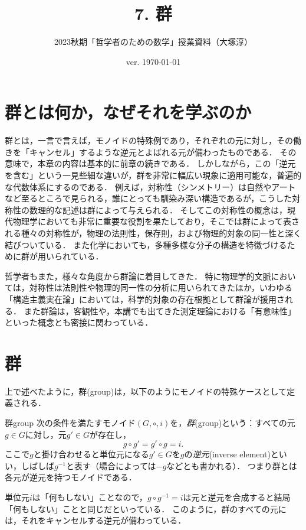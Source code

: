 \documentclass[11pt,a4paper]{jsarticle}
\begin{document}
\title{7. 群}
\author{2023秋期「哲学者のための数学」授業資料（大塚淳）}
\date{ver. \today}
\maketitle

\section{群とは何か，なぜそれを学ぶのか}
群とは，一言で言えば，モノイドの特殊例であり，それぞれの元に対し，その働きを「キャンセル」するような逆元とよばれる元が備わったものである．
その意味で，本章の内容は基本的に前章の続きである．
しかしながら，この「逆元を含む」という一見些細な違いが，群を非常に幅広い現象に適用可能な，普遍的な代数体系にするのである．
例えば，対称性（シンメトリー）は自然やアートなど至るところで見られる，誰にとっても馴染み深い構造であるが，こうした対称性の数理的な記述は群によって与えられる．
そしてこの対称性の概念は，現代物理学においても非常に重要な役割を果たしており，そこでは群によって表される種々の対称性が，物理の法則性，保存則，および物理的対象の同一性と深く結びついている．
また化学においても，多種多様な分子の構造を特徴づけるために群が用いられている．

哲学者もまた，様々な角度から群論に着目してきた．
特に物理学的文脈においては，対称性は法則性や物理的同一性の分析に用いられてきたほか，いわゆる「構造主義実在論」においては，科学的対象の存在根拠として群論が援用される．
また群論は，客観性や，本講でも出てきた測定理論における「有意味性」といった概念とも密接に関わっている．



\section{群}
上で述べたように，群(group)は，以下のようにモノイドの特殊ケースとして定義される．
\begin{dfn}{群}{group}
    次の条件を満たすモノイド$(G, \circ, i)$を，\emph{群}(group)という：すべての元$g \in G$に対し，元$g' \in G$が存在し，
    \[ g \circ g' = g' \circ g = i.\]
    ここで$g$と掛け合わせると単位元になる$g' \in G$を$g$の\emph{逆元}(inverse element)といい，しばしば$g^{-1}$と表す（場合によっては$-g$などとも書かれる）．
    つまり群とは各元が逆元を持つモノイドである．
\end{dfn}    

単位元$i$は「何もしない」ことなので，$g \circ g^{-1} = i$は元と逆元を合成すると結局「何もしない」ことと同じだといっている．
このように，群のすべての元には，それをキャンセルする逆元が備わっている．
\end{document}
